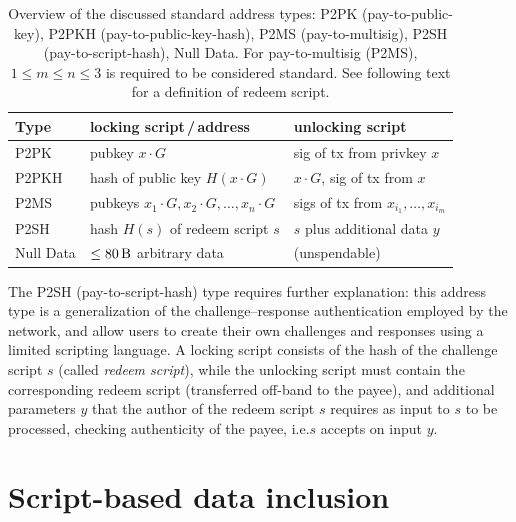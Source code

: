 \documentclass[a4paper,11pt,titlepage]{scrbook}
\begin{document}
\begin{table}
    \renewcommand{\arraystretch}{1.2}
    \centering
    \begin{tabular}{lll}
        \toprule
        \textbf{Type} & \textbf{locking script\,/\,address} & \textbf{unlocking script} \\
        \midrule
        P2PK & pubkey $x\cdot G$ & sig of tx from privkey $x$ \\
        P2PKH & hash of public key $H(x\cdot G)$ & $x\cdot G$, sig of tx from $x$ \\
        P2MS & pubkeys $x_1{\cdot} G, x_2{\cdot} G, \dots, x_n{\cdot} G$ & sigs of tx from $x_{i_1}, \dots, x_{i_m}$ \\
        P2SH & hash $H(s)$ of redeem script $s$ & $s$ plus additional data $y$ \\
        Null Data & $\leq \SI{80}{\byte}$ arbitrary data & (unspendable)\\
        \bottomrule
    \end{tabular}
    \caption[Overview of the discussed standard address types]{Overview of the discussed standard address types: P2PK (pay-to-public-key), P2PKH (pay-to-public-key-hash), P2MS (pay-to-multisig), P2SH (pay-to-script-hash), Null Data. For pay-to-multisig (P2MS), $1\leq m\leq n\leq 3$ is required to be considered standard. See following text for a definition of redeem script.}
    \label{table:script-types}
\end{table}

The P2SH (pay-to-script-hash) type requires further explanation: this address type is a generalization of the challenge–response authentication employed by the network, and allow users to create their own challenges and responses using a limited scripting language.
A locking script consists of the hash of the challenge script $s$ (called \emph{redeem script}), while the unlocking script must contain the corresponding redeem script (transferred off-band to the payee), and additional parameters $y$ that the author of the redeem script $s$ requires as input to $s$ to be processed, checking authenticity of the payee, i.e.\@ $s$ accepts on input $y$.




\section{Script-based data inclusion}\label{sec:fakekeys}
\end{document}
